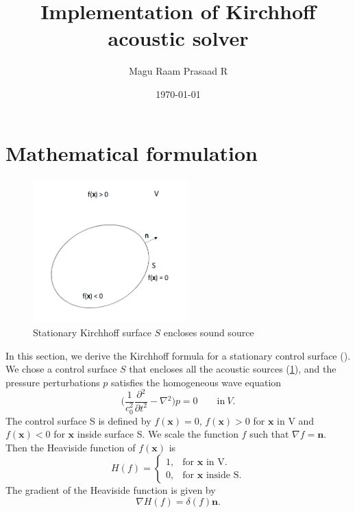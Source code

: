 \documentclass[a4paper]{article}
\title{Implementation of Kirchhoff acoustic solver}
\author{Magu Raam Prasaad R}
\date{\today}
\begin{document}
\maketitle                                                                                                
\section{Mathematical formulation}
\begin{figure}[h!]\label{Kirchhoff}
	\centering
	\includegraphics[width=60mm]{images/kirchhoff_surface.png}
	\caption{Stationary Kirchhoff surface $S$ encloses sound source}
\end{figure}
In this section, we derive the Kirchhoff formula for a stationary control surface (\cite{FARASSAT1988451}). We chose a control surface $S$ that encloses all the acoustic sources (\ref{Kirchhoff}), and the pressure perturbations $p$ satisfies the homogeneous wave equation 
\begin{equation}\label{Wave equation}
	\Bigg( \frac{1}{c_{0}^2}\frac{\partial{}^{2}}{\partial{t}^{2}}- \nabla{}^{2} \Bigg) p = 0 \quad \quad \textrm{in} \ V. 
\end{equation}
The control surface S is defined by $f(\mathbf{x}) = 0$, $f(\mathbf{x}) > 0$ for $\mathbf{x}$ in V and $f(\mathbf{x}) < 0$ for $\mathbf{x}$ inside surface S. We scale the function $f$ such that $\nabla f = \mathbf{n}$. Then the Heaviside function of $f(\mathbf{x})$    is
\begin{equation}\label{Heaviside}
	H(f) =\begin{cases}
	1, & \text{for $\mathbf{x}$ in V}.\\
	0, & \text{for $\mathbf{x}$ inside S}.
	\end{cases}
\end{equation}
The gradient of the Heaviside function is given by
\begin{equation}\label{Gradient Heaviside}
	\nabla H(f) = \delta (f) \mathbf{n}.
\end{equation}
\end{document}

